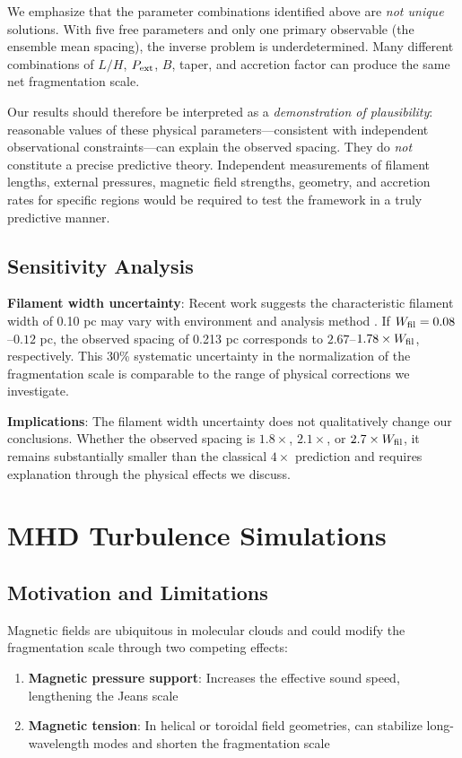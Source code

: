\documentclass[11pt,a4paper]{article}
\begin{document}
We emphasize that the parameter combinations identified above are \textit{not unique} solutions. With five free parameters and only one primary observable (the ensemble mean spacing), the inverse problem is underdetermined. Many different combinations of $L/H$, $P_{\rm ext}$, $B$, taper, and accretion factor can produce the same net fragmentation scale.

Our results should therefore be interpreted as a \textit{demonstration of plausibility}: reasonable values of these physical parameters—consistent with independent observational constraints—can explain the observed spacing. They do \textit{not} constitute a precise predictive theory. Independent measurements of filament lengths, external pressures, magnetic field strengths, geometry, and accretion rates for specific regions would be required to test the framework in a truly predictive manner.

\subsection{Sensitivity Analysis}
\label{sec:sensitivity}

\textbf{Filament width uncertainty}: Recent work suggests the characteristic filament width of 0.10 pc may vary with environment and analysis method \citep{Panopoulou2022, Hacar2023}. If $W_{\rm fil} = 0.08$--$0.12$ pc, the observed spacing of 0.213 pc corresponds to $2.67$--$1.78\times W_{\rm fil}$, respectively. This 30\% systematic uncertainty in the normalization of the fragmentation scale is comparable to the range of physical corrections we investigate.

\textbf{Implications}: The filament width uncertainty does not qualitatively change our conclusions. Whether the observed spacing is $1.8\times$, $2.1\times$, or $2.7\times W_{\rm fil}$, it remains substantially smaller than the classical $4\times$ prediction and requires explanation through the physical effects we discuss.

\section{MHD Turbulence Simulations}

\subsection{Motivation and Limitations}

Magnetic fields are ubiquitous in molecular clouds and could modify the fragmentation scale through two competing effects:
\begin{enumerate}
    \item \textbf{Magnetic pressure support}: Increases the effective sound speed, lengthening the Jeans scale
    \item \textbf{Magnetic tension}: In helical or toroidal field geometries, can stabilize long-wavelength modes and shorten the fragmentation scale
\end{enumerate}
\end{document}
